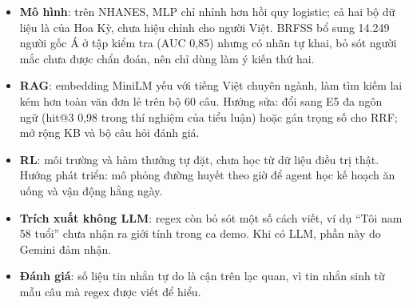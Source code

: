 \begin{itemize}
  \item \textbf{Mô hình}: trên NHANES, MLP chỉ nhỉnh hơn hồi quy logistic; cả hai bộ dữ liệu là của Hoa Kỳ, chưa hiệu chỉnh cho người Việt. BRFSS bổ sung 14.249 người gốc Á ở tập kiểm tra (AUC 0,85) nhưng có nhãn tự khai, bỏ sót người mắc chưa được chẩn đoán, nên chỉ dùng làm ý kiến thứ hai.
  \item \textbf{RAG}: embedding MiniLM yếu với tiếng Việt chuyên ngành, làm tìm kiếm lai kém hơn toàn văn đơn lẻ trên bộ 60 câu. Hướng sửa: đổi sang E5 đa ngôn ngữ (hit@3 0,98 trong thí nghiệm của tiểu luận) hoặc gán trọng số cho RRF; mở rộng KB và bộ câu hỏi đánh giá.
  \item \textbf{RL}: môi trường và hàm thưởng tự đặt, chưa học từ dữ liệu điều trị thật. Hướng phát triển: mô phỏng đường huyết theo giờ để agent học kế hoạch ăn uống và vận động hằng ngày.
  \item \textbf{Trích xuất không LLM}: regex còn bỏ sót một số cách viết, ví dụ ``Tôi nam 58 tuổi'' chưa nhận ra giới tính trong ca demo. Khi có LLM, phần này do Gemini đảm nhận.
  \item \textbf{Đánh giá}: số liệu tin nhắn tự do là cận trên lạc quan, vì tin nhắn sinh từ mẫu câu mà regex được viết để hiểu.
\end{itemize}

